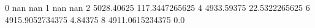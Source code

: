 0 nan nan
1 nan nan
2 5028.40625 117.3447265625
4 4933.59375 22.5322265625
6 4915.9052734375 4.84375
8 4911.0615234375 0.0
